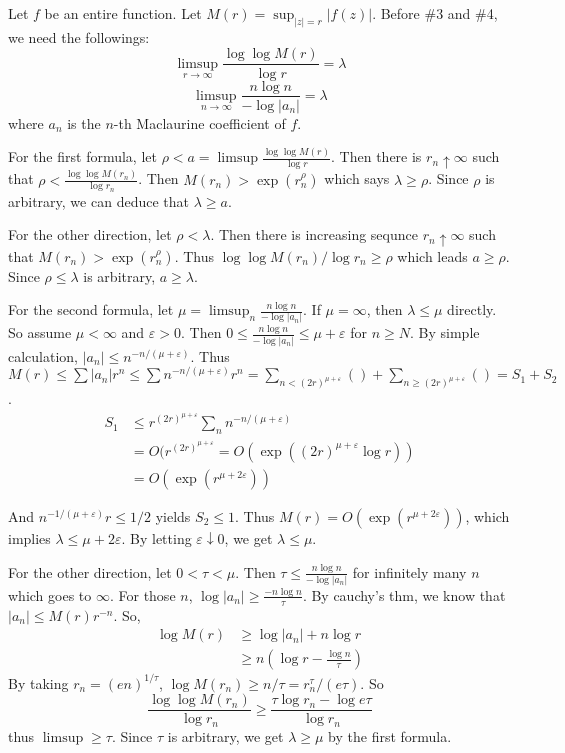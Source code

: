 Let $f$ be an entire function.
Let $M(r) = \sup_{|z| = r}|f(z)|$.
Before \#3 and \#4, we need the followings:
\[
	\limsup_{r \rightarrow \infty} \frac{\log \log M(r)}{\log r} = \lambda
\]
\[
	\limsup_{n\rightarrow \infty} \frac{n \log n}{-\log |a_n|} = \lambda
\]
where $a_n$ is the $n$-th Maclaurine coefficient of $f$. 

For the first formula, let $\rho < a = \limsup \frac{\log \log M(r)}{\log r}$.
Then there is $r_n \uparrow \infty$ such that $\rho < \frac{\log \log M(r_n)}{\log r_n}$.
Then $M(r_n) > \exp(r_n^{\rho})$ which says $\lambda \geq \rho$.
Since $\rho$ is arbitrary, we can deduce that $\lambda \geq a$.

For the other direction, let $\rho < \lambda$.
Then there is increasing sequnce $r_n \uparrow \infty$ such that $M(r_n) > \exp(r_n ^\rho)$.
Thus $\log \log M(r_n) / \log r_n \geq \rho$ which leads $a \geq \rho$.
Since $\rho \leq \lambda$ is arbitrary, $a \geq \lambda$.

For the second formula, let $\mu = \limsup_n \frac{n\log n}{-\log |a_n|}$.
If $\mu = \infty$, then $\lambda \leq \mu$ directly. So assume $\mu < \infty$ and $\varepsilon>0$.
Then $0 \leq \frac{n\log n }{-\log |a_n|} \leq \mu + \varepsilon$ for $n \geq N$.
By simple calculation, $|a_n| \leq n^{-n/(\mu + \varepsilon)}$.
Thus $M(r) \leq \sum |a_n| r^n \leq \sum n^{-n/(\mu+\varepsilon)}r^n = \sum_{n <(2r)^{\mu + \varepsilon}} ( ) + \sum_{n \geq (2r)^{\mu+\varepsilon}}( ) = S_1 + S_2$. \\
\[
	\begin{split}
		S_1 & \leq r^{(2r)^{\mu+\varepsilon}} \sum_n n^{-n/(\mu+\varepsilon)} \\
		& = O(r^{(2r)^{\mu+\varepsilon}} = O(\exp( (2r)^{\mu+\varepsilon} \log r) ) \\
			& = O(\exp(r^{\mu + 2\varepsilon}))
	\end{split}
\]

And $n^{-1/(\mu+\varepsilon)}r \leq 1/2$ yields $S_2 \leq 1$.
Thus $M(r) = O(\exp(r^{\mu+2\varepsilon}))$, which implies $\lambda \leq \mu + 2\varepsilon$.
By letting $\varepsilon \downarrow 0$, we get $\lambda \leq \mu$.

For the other direction, let $0 < \tau < \mu$.
Then $\tau \leq \frac{n \log n}{-\log |a_n|}$ for infinitely many $n$ which goes to $\infty$.
For those $n$, $\log |a_n| \geq \frac{-n\log n}{\tau}$.
By cauchy's thm, we know that $|a_n| \leq M(r) r^{-n}$.
So, 
\[
\begin{split}
	\log M(r)
& \geq \log|a_n| + n\log r \\
& \geq n\left( \log r - \frac{\log n}{\tau} \right)
\end{split}
\]
By taking $r_n = (en)^{1/\tau}$, $\log M(r_n) \geq n/\tau = r_n^\tau / (e\tau)$.
So 
\[
	\frac{\log \log M(r_n)}{\log r_n} \geq \frac{\tau \log r_n - \log e\tau}{\log r_n}
\]
thus $\limsup \geq \tau$.
Since $\tau$ is arbitrary, we get $\lambda \geq \mu$ by the first formula.

